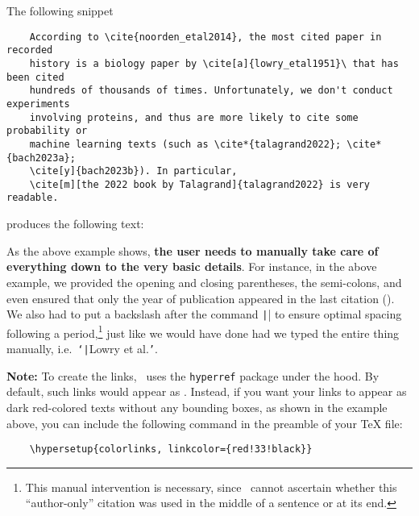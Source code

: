 \documentclass[letter, 11pt]{article}
\begin{document}
  The following snippet
  \begin{verbatim}
    According to \cite{noorden_etal2014}, the most cited paper in recorded
    history is a biology paper by \cite[a]{lowry_etal1951}\ that has been cited
    hundreds of thousands of times. Unfortunately, we don't conduct experiments
    involving proteins, and thus are more likely to cite some probability or
    machine learning texts (such as \cite*{talagrand2022}; \cite*{bach2023a};
    \cite[y]{bach2023b}). In particular,
    \cite[m][the 2022 book by Talagrand]{talagrand2022} is very readable.
  \end{verbatim}
  produces the following text:
  \begin{center}
  \end{center}
  
  As the above example shows, \textbf{the user needs to manually take care of everything down to the very basic details}. For instance, in the above example, we provided the opening and closing parentheses, the semi-colons, and even ensured that only the year of publication appeared in the last citation (\cite*{bach2023b}). We also had to put a backslash after the command \texttt|\cite[a]{lowry_etal1951}| to ensure optimal spacing following a period,\footnote{This manual intervention is necessary, since \dumbib\ cannot ascertain whether this ``author-only'' citation was used in the middle of a sentence or at its end.} just like we would have done had we typed the entire thing manually, i.e.\ \texttt{`}\texttt|Lowry et al.\|\texttt{'}.

  \noindent \textbf{Note:}  To create the links, \dumbib\ uses the \texttt{hyperref} package under the hood. By default, such links would appear as . Instead, if you want your links to appear as dark red-colored texts without any bounding boxes, as shown in the example above, you can include the following command in the preamble of your \TeX{} file:
  \begin{verbatim}
    \hypersetup{colorlinks, linkcolor={red!33!black}}
  \end{verbatim}
\end{document}
